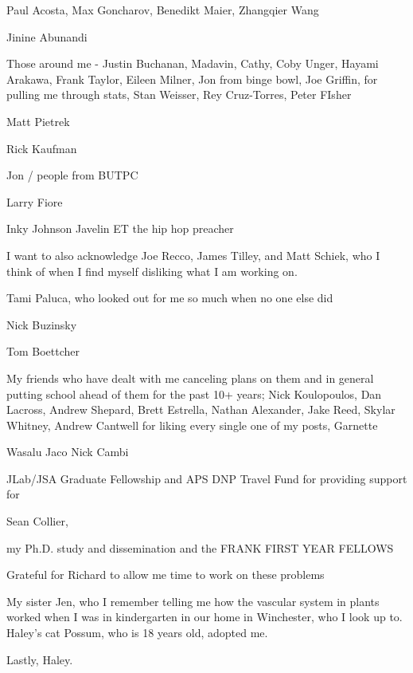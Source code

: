 Paul Acosta, Max Goncharov, Benedikt Maier, Zhangqier Wang


Jinine Abunandi

Those around me - Justin Buchanan, Madavin, Cathy, Coby Unger, Hayami Arakawa, Frank Taylor, Eileen Milner, Jon from binge bowl, Joe Griffin, for pulling me through stats, Stan Weisser, Rey Cruz-Torres, Peter FIsher

Matt Pietrek

Rick Kaufman

Jon / people from BUTPC

Larry Fiore

Inky Johnson
Javelin
ET the hip hop preacher

I want to also acknowledge Joe Recco, James Tilley, and Matt  Schiek, who I think of when I find myself disliking what I am working on. 

Tami Paluca, who looked out for me so much when no one else did

Nick Buzinsky

Tom Boettcher


My friends who have dealt with me canceling plans on them and in general putting school ahead of them for the past 10+ years; Nick Koulopoulos, Dan Lacross, Andrew Shepard, Brett Estrella, Nathan Alexander, Jake Reed, Skylar Whitney, Andrew Cantwell for liking every single one of my posts, Garnette


Wasalu Jaco
Nick Cambi

JLab/JSA Graduate Fellowship and APS DNP Travel Fund for providing support for

Sean Collier,


my Ph.D. study and dissemination and the FRANK FIRST YEAR FELLOWS


Grateful for Richard to allow me time to work on these problems

My sister Jen, who I remember telling me how the vascular system in plants worked when I was in kindergarten in our home in Winchester, who I look up to. Haley's cat Possum, who is 18 years old, adopted me. 

Lastly, Haley. 

